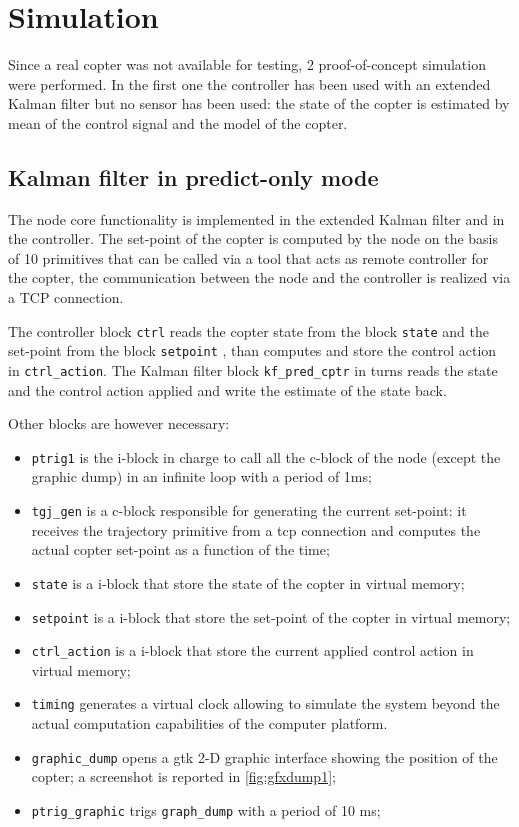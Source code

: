 \chapter{Simulation}
\label{ch:simulation} 
Since a real copter was not available for testing, 2 proof-of-concept simulation were performed. In the first one the controller has been used with an extended Kalman filter but no sensor has been used: the state of the copter is estimated by mean of the control signal and the model of the copter.

\section{Kalman filter in predict-only mode}

The node core functionality is implemented in the extended Kalman filter and in the controller. The set-point of the copter is computed by the node on the basis of 10 primitives that can be called via a tool that acts as remote controller for the copter, the communication between the node and the controller is realized via a TCP connection.

The controller block \texttt{ctrl} reads the copter state from the block \texttt{state} and the set-point from the block \texttt{setpoint} , than computes and store the control action in \texttt{ctrl\_action}. The Kalman filter block \texttt{kf\_pred\_cptr} in turns reads the state and the control action applied and write the estimate of the state back.

Other blocks are however necessary:
\begin{itemize}
	\item \texttt{ptrig1} is the i-block in charge to call all the c-block of the node (except the graphic dump) in an infinite loop with a period of 1ms;
	\item \texttt{tgj\_gen} is a c-block responsible for generating the current set-point: it receives the trajectory primitive from a tcp connection and computes the actual copter set-point as a function of the time;
	\item \texttt{state} is a i-block that store the state of the copter in virtual memory;
	\item \texttt{setpoint} is a i-block that store the set-point of the copter in virtual memory;
	\item \texttt{ctrl\_action} is a i-block that store the current applied control action in virtual memory;
	\item \texttt{timing} generates a virtual clock allowing to simulate the system beyond the actual computation capabilities of the computer platform.
	\item \texttt{graphic\_dump} opens a gtk 2-D graphic interface showing the position of the copter; a screenshot is reported in \autoref{fig:gfxdump1};
	\item \texttt{ptrig\_graphic} trigs \texttt{graph\_dump} with a period of 10 ms;
\end{itemize}


